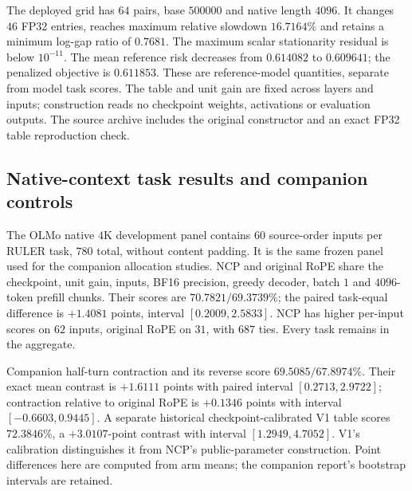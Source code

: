The deployed grid has $64$ pairs, base $500000$ and native length $4096$.
It changes $46$ FP32 entries, reaches maximum relative slowdown $16.7164\%$
and retains a minimum log-gap ratio of $0.7681$. The maximum scalar stationarity
residual is below $10^{-11}$. The mean reference risk decreases from
$0.614082$ to $0.609641$; the penalized objective is $0.611853$.
These are reference-model quantities, separate from model task scores.
The table and unit gain are fixed across layers and inputs; construction reads
no checkpoint weights, activations or evaluation outputs. The source archive
includes the original constructor and an exact FP32 table reproduction check.

\subsection{Native-context task results and companion controls}
\label{sec:ncp-results-new}
The OLMo native $4$K development panel contains $60$ source-order inputs per
RULER task, $780$ total, without content padding. It is the same frozen panel
used for the companion allocation studies. NCP and original RoPE share the
checkpoint, unit gain, inputs, BF16 precision, greedy decoder, batch $1$ and
$4096$-token prefill chunks. Their scores are $70.7821/69.3739\%$;
the paired task-equal difference is $+1.4081$ points, interval
$[0.2009,2.5833]$. NCP has higher per-input scores on $62$ inputs,
original RoPE on $31$, with $687$ ties. Every task remains in the aggregate.

Companion half-turn contraction and its reverse score $69.5085/67.8974\%$.
Their exact mean contrast is $+1.6111$ points with paired interval
$[0.2713,2.9722]$; contraction relative to original RoPE is $+0.1346$
points with interval $[-0.6603,0.9445]$. A separate historical
checkpoint-calibrated V1 table scores $72.3846\%$, a $+3.0107$-point
contrast with interval $[1.2949,4.7052]$. V1's calibration distinguishes it
from NCP's public-parameter construction. Point differences here are computed
from arm means; the companion report's bootstrap intervals are retained.
\FloatBarrier
